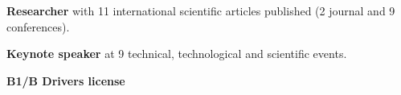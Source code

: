 

\begin{cventries}

  \cventry
    {} 
    {} 
    {} 
    {} 
    {
      \vspace{-.6cm}
      \begin{cvitems} %
        \item[] {\hspace{-.4cm} \textbf{Researcher} with 11 international scientific articles published (2 journal and 9 conferences).}
        \item[] {\hspace{-.4cm} \textbf{Keynote speaker} at 9 technical, technological and scientific events.}
        \item[] {\hspace{-.4cm} \textbf{B1/B Drivers license}}
      \end{cvitems}
    }

\end{cventries}
